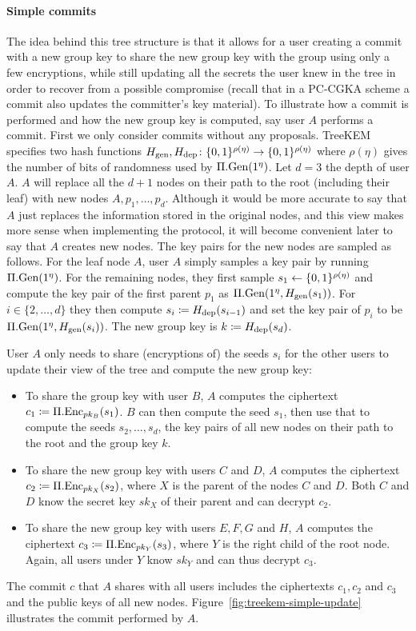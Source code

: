 \paragraph{Simple commits} The idea behind this tree structure is that it allows for a user creating a commit with a new group key to share the new group key with the group using only a few encryptions, while still updating all the secrets the user knew in the tree in order to recover from a possible compromise (recall that in a PC-CGKA scheme a commit also updates the committer's key material).
To illustrate how a commit is performed and how the new group key is computed, say user $A$ performs a commit. First we only consider commits without any proposals. TreeKEM specifies two hash functions $H_\mathrm{gen}, H_\mathrm{dep} \colon \{0, 1\}^{\rho(\eta)} \to \{0, 1\}^{\rho(\eta)}$ where $\rho(\eta)$ gives the number of bits of randomness used by $\Pi.\mathrm{Gen}(1^\eta)$. Let $d = 3$ the depth of user $A$. $A$ will replace all the $d + 1$ nodes on their path to the root (including their leaf) with new nodes $A, p_1, \ldots, p_d$. Although it would be more accurate to say that $A$ just replaces the information stored in the original nodes, and this view makes more sense when implementing the protocol, it will become convenient later to say that $A$ creates new nodes.
The key pairs for the new nodes are sampled as follows. For the leaf node $A$, user $A$ simply samples a key pair by running $\Pi.\mathrm{Gen}(1^\eta)$. For the remaining nodes, they first sample $s_1 \leftarrow \{0, 1\}^{\rho(\eta)}$ and compute the key pair of the first parent $p_1$ as $\Pi.\mathrm{Gen}(1^\eta, H_\mathrm{gen}(s_1))$. For $i \in \{2, \ldots, d\}$ they then compute $s_i \coloneqq H_\mathrm{dep}(s_{i - 1})$ and set the key pair of $p_i$ to be $\Pi.\mathrm{Gen}(1^\eta, H_\mathrm{gen}(s_i))$. The new group key is $k \coloneqq H_\mathrm{dep}(s_{d})$.

User $A$ only needs to share (encryptions of) the seeds $s_i$ for the other users to update their view of the tree and compute the new group key:
\begin{itemize}
	\item To share the group key with user $B$, $A$ computes the ciphertext $c_1 \coloneqq \Pi.\mathrm{Enc}_{pk_B}(s_1)$. $B$ can then compute the seed $s_1$, then use that to compute the seeds $s_2, \ldots, s_d$, the key pairs of all new nodes on their path to the root and the group key $k$.
	\item To share the new group key with users $C$ and $D$, $A$ computes the ciphertext $c_2 \coloneqq \Pi.\mathrm{Enc}_{pk_X}(s_2)$, where $X$ is the parent of the nodes $C$ and $D$. Both $C$ and $D$ know the secret key $sk_X$ of their parent and can decrypt $c_2$.
	\item To share the new group key with users $E, F, G$ and $H$, $A$ computes the ciphertext $c_3 \coloneqq \Pi.\mathrm{Enc}_{pk_Y}(s_3)$, where $Y$ is the right child of the root node. Again, all users under $Y$ know $sk_Y$ and can thus decrypt $c_3$.
\end{itemize}
The commit $c$ that $A$ shares with all users includes the ciphertexts $c_1, c_2$ and $c_3$ and the public keys of all new nodes. Figure~\ref{fig:treekem-simple-update} illustrates the commit performed by $A$.

